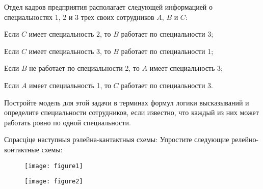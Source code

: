 \begin{problemList}
		{Отдел кадров предприятия располагает следующей информацией о специальностях 1, 2 и 3 трех своих сотрудников $A$, $B$ и $C$:
		\begin{russianEnumerate}
			\item Если $C$ имеет специальность 2, то $B$ работает по специальности 3;
			\item Если $C$ имеет специальность 3, то $B$ работает по специальности 1;
			\item Если $B$ не работает по специальности 2, то $A$ имеет специальность 3;
			\item Если $A$ имеет специальность 1, то $C$ работает по специальности 3.
		\end{russianEnumerate}
		Постройте модель для этой задачи в терминах формул логики высказываний и определите  специальности сотрудников, если известно, что каждый из них может работать ровно по  одной специальности.}
		
		\bigskip
		
		\problemItemWithCommonPart
		{Спрасціце наступныя рэлейна-кантактныя схемы:}
		{Упростите следующие релейно-контактные схемы:}
		{%
			\begin{figure}[H]
			\begin{center}
				\texttt{[image: figure1]}
			\end{center}
		\end{figure}
		
		\begin{figure}[H]
			\begin{center}
				\texttt{[image: figure2]}
			\end{center}
		\end{figure}
		}
		\bigskip
		

\end{problemList}
